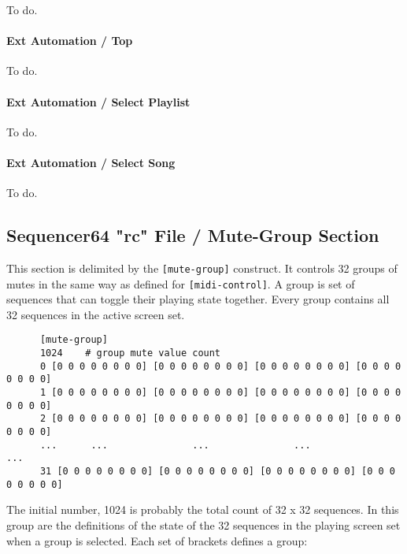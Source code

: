    To do.

\paragraph{Ext Automation / Top}
\label{paragraph:seq64_rc_file_midi_ctrl_ex_top}

   To do.

\paragraph{Ext Automation / Select Playlist}
\label{paragraph:seq64_rc_file_midi_ctrl_ex_sellist}

   To do.

\paragraph{Ext Automation / Select Song}
\label{paragraph:seq64_rc_file_midi_ctrl_ex_selsong}

   To do.

\subsection{Sequencer64 "rc" File / Mute-Group Section}
\label{subsec:seq64_rc_file_mute_group}
     
   This section is delimited by the \texttt{[mute-group]} construct.
   It controls 32 groups of mutes in the same way as defined for
   \texttt{[midi-control]}. A group is set of sequences that can toggle their
   playing state together.  Every group contains all 32 sequences in the
   active screen set.

   \begin{verbatim}
      [mute-group]
      1024    # group mute value count
      0 [0 0 0 0 0 0 0 0] [0 0 0 0 0 0 0 0] [0 0 0 0 0 0 0 0] [0 0 0 0 0 0 0 0]
      1 [0 0 0 0 0 0 0 0] [0 0 0 0 0 0 0 0] [0 0 0 0 0 0 0 0] [0 0 0 0 0 0 0 0]
      2 [0 0 0 0 0 0 0 0] [0 0 0 0 0 0 0 0] [0 0 0 0 0 0 0 0] [0 0 0 0 0 0 0 0]
      ...      ...               ...               ...               ...
      31 [0 0 0 0 0 0 0 0] [0 0 0 0 0 0 0 0] [0 0 0 0 0 0 0 0] [0 0 0 0 0 0 0 0]
   \end{verbatim}

   The initial number, 1024 is probably the total count of 32 x 32 sequences.
   In this group are the definitions of the state of the 32 sequences
   in the playing screen set when a group is selected.
   Each set of brackets defines a group:
   
